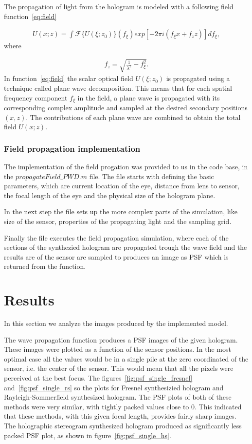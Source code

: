 \documentclass[12pt,a4paper,english
]{tunithesis}
\begin{document}
The propagation of light from the hologram is modeled with a following field function~\ref{eq:field}

\begin{align}
  \label{eq:field}
  U(x;z) = \int \mathscr{F} \{U (\xi;z_0) \} (f_\xi) exp[-2 \pi i (f_\xi x + f_z z)] d f_\xi,
\end{align}
where

\begin{align}
  \label{eq:focus}
  f_z = \sqrt{\frac{1}{\lambda^2} - f_\xi ^ 2}.
\end{align}
In function~\ref{eq:field} the scalar optical field $U(\xi;z_0)$ is propagated using a technique called plane wave decomposition. This means that for each spatial frequency component $f_\xi$ in the field, a plane wave is propagated with its corresponding complex amplitude and sampled at the desired secondary positions $(x, z)$. The contributions of each plane wave are combined to obtain the total field $U(x;z)$.

\subsection{Field propagation implementation}
The implementation of the field progation was provided to us in the code base, in the $propagateField\_PWD.m$ file. The file starts with defining the basic parameters, which are current location of the eye, distance from lens to sensor, the focal length of the eye and the physical size of the hologram plane.

In the next step the file sets up the more complex parts of the simulation, like size of the sensor, properties of the propagating light and the sampling grid.

Finally the file executes the field propagation simulation, where each of the sections of the synthezied hologram are propagated trough the wave field and the results are of the sensor are sampled to produces an image as PSF which is returned from the function.


\chapter{Results}
\label{sec:results}
In this section we analyze the images produced by the implemented model.

The wave propagation function produces a PSF images of the given hologram. These images were plotted as a function of the sensor positions. In the most optimal case all the values would be in a single pile at the zero coordinated of the sensor, i.e. the center of the sensor. This would mean that all the pixels were perceived at the best focus. The figures~\ref{fig:psf_single_fresnel} and~\ref{fig:psf_single_rs} so the plots for Fresnel synthesizied hologram and Rayleigh-Sommerfield synthesized hologram. The PSF plots of both of these methods were very similar, with tightly packed values close to 0. This indicated that these methods, with this given focal length, provides fairly sharp images. The holographic stereogram synthesized hologram produced as significantly less packed PSF plot, as shown in figure~\ref{fig:psf_single_hs}.
\end{document}
